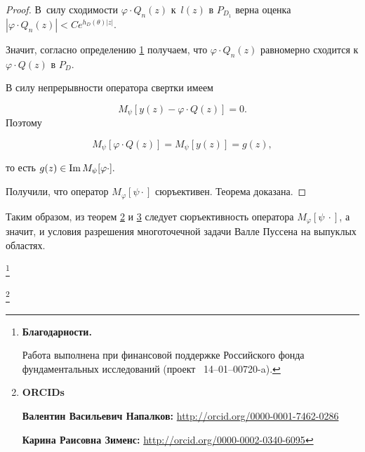 \begin{proof}
В~силу сходимости $\varphi \cdot Q_n(z)$ к~$l(z)$ в $P_{D_1}$ верна оценка $|\varphi \cdot Q_n(z)|<Ce^{h_D(\theta)|z|}$.



Значит, согласно определению \hyperlink{nap:z:d1}{1} получаем, что $\varphi \cdot Q_n(z)$ равномерно сходится к $\varphi \cdot Q(z)$ в $P_D$. 

В силу непрерывности оператора свертки имеем 

\[ 

M_\psi[y(z)-\varphi\cdot Q(z)]=0.

\] Поэтому 

$$M_\psi[\varphi\cdot Q(z)]=M_\psi[y(z)]=g(z),$$ 

то есть $g(z)\in \mathop{\rm Im} M_\psi[\varphi \cdot].$ 

Получили, что оператор $M_\varphi[\psi\cdot]$ сюръективен. Теорема доказана. 

\end{proof}



\smallskip



Таким образом, из теорем \hyperlink{nap:z:t2}{2} и \hyperlink{nap:z:t3}{3} следует сюръективность оператора  $M_{\varphi}[{\psi~\cdot}]$, а значит, и условия разрешения многоточечной задачи Валле Пуссена на выпуклых областях. 









\thanks{\textbf{Благодарности.} 

Работа выполнена при финансовой поддержке Российского фонда фундаментальных исследований (проект \No~14--01--00720-a).

}



\thanks{{\bf ORCIDs}



{\bf Валентин Васильевич Напалков:} \url{http://orcid.org/0000-0001-7462-0286}



{\bf Карина Раисовна Зименс:} \url{http://orcid.org/0000-0002-0340-6095}





}



\RusRef







